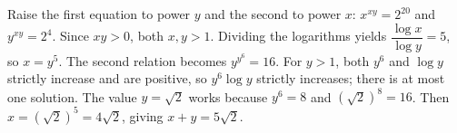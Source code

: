 Raise the first equation to power $y$ and the second to power $x$: $x^{xy}=2^{20}$ and $y^{xy}=2^4$. Since $xy>0$, both $x,y>1$. Dividing the logarithms yields $\dfrac{\log x}{\log y}=5$, so $x=y^5$. The second relation becomes $y^{y^6}=16$. For $y>1$, both $y^6$ and $\log y$ strictly increase and are positive, so $y^6\log y$ strictly increases; there is at most one solution. The value $y=\sqrt2$ works because $y^6=8$ and $(\sqrt2)^8=16$. Then $x=(\sqrt2)^5=4\sqrt2$, giving $\boxed{x+y=5\sqrt2}$.

